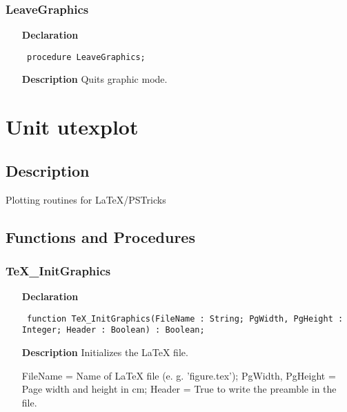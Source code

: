 \documentclass[12pt,a4paper,oneside]{report}
\newcommand{\declarationitem}[1]{\textbf{#1}}
\newcommand{\descriptiontitle}[1]{\textbf{#1}}
\newcommand{\code}[1]{\texttt{#1}}
\begin{document}
\subsubsection{LeaveGraphics}
\label{uplot-LeaveGraphics}
\begin{itemize}\item[\declarationitem{Declaration}\hfill]
	\begin{flushleft}
		\code{
			procedure LeaveGraphics;}
		
	\end{flushleft}
	
	\par
	\item[\descriptiontitle{Description}]
	Quits graphic mode.
	
\end{itemize}
\section{Unit utexplot}
\label{utexplot}
\subsection{Description}
Plotting routines for LaTeX/PSTricks
\subsection{Functions and Procedures}
\subsubsection{TeX{\_}InitGraphics}
\label{utexplot-TeX_InitGraphics}
\begin{itemize}\item[\declarationitem{Declaration}\hfill]
	\begin{flushleft}
		\code{
			function TeX{\_}InitGraphics(FileName : String; PgWidth, PgHeight : Integer; Header : Boolean) : Boolean;}
		
	\end{flushleft}
	
	\par
	\item[\descriptiontitle{Description}]
	Initializes the LaTeX file.
	
	FileName = Name of LaTeX file (e. g. 'figure.tex'); PgWidth, PgHeight = Page width and height in cm; Header = True to write the preamble in the file.
	
\end{itemize}
\end{document}
